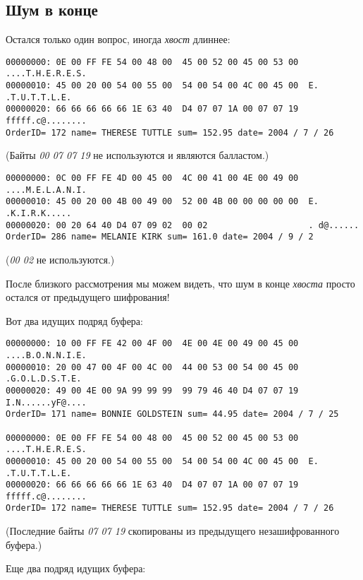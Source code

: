 \subsection{Шум в конце}

Остался только один вопрос, иногда \emph{хвост} длиннее:

\begin{lstlisting}
00000000: 0E 00 FF FE 54 00 48 00  45 00 52 00 45 00 53 00  ....T.H.E.R.E.S.
00000010: 45 00 20 00 54 00 55 00  54 00 54 00 4C 00 45 00  E. .T.U.T.T.L.E.
00000020: 66 66 66 66 66 1E 63 40  D4 07 07 1A 00 07 07 19  fffff.c@........
OrderID= 172 name= THERESE TUTTLE sum= 152.95 date= 2004 / 7 / 26
\end{lstlisting}

(Байты \emph{00 07 07 19} не используются и являются балластом.)

\begin{lstlisting}
00000000: 0C 00 FF FE 4D 00 45 00  4C 00 41 00 4E 00 49 00  ....M.E.L.A.N.I.
00000010: 45 00 20 00 4B 00 49 00  52 00 4B 00 00 00 00 00  E. .K.I.R.K.....
00000020: 00 20 64 40 D4 07 09 02  00 02                    . d@......
OrderID= 286 name= MELANIE KIRK sum= 161.0 date= 2004 / 9 / 2
\end{lstlisting}

(\emph{00 02} не используются.)

После близкого рассмотрения мы можем видеть, что шум в конце \emph{хвоста} просто остался от предыдущего
шифрования!

Вот два идущих подряд буфера:

\begin{lstlisting}
00000000: 10 00 FF FE 42 00 4F 00  4E 00 4E 00 49 00 45 00  ....B.O.N.N.I.E.
00000010: 20 00 47 00 4F 00 4C 00  44 00 53 00 54 00 45 00   .G.O.L.D.S.T.E.
00000020: 49 00 4E 00 9A 99 99 99  99 79 46 40 D4 07 07 19  I.N......yF@....
OrderID= 171 name= BONNIE GOLDSTEIN sum= 44.95 date= 2004 / 7 / 25

00000000: 0E 00 FF FE 54 00 48 00  45 00 52 00 45 00 53 00  ....T.H.E.R.E.S.
00000010: 45 00 20 00 54 00 55 00  54 00 54 00 4C 00 45 00  E. .T.U.T.T.L.E.
00000020: 66 66 66 66 66 1E 63 40  D4 07 07 1A 00 07 07 19  fffff.c@........
OrderID= 172 name= THERESE TUTTLE sum= 152.95 date= 2004 / 7 / 26
\end{lstlisting}

(Последние байты \emph{07 07 19} скопированы из предыдущего незашифрованного буфера.)

Еще два подряд идущих буфера:

